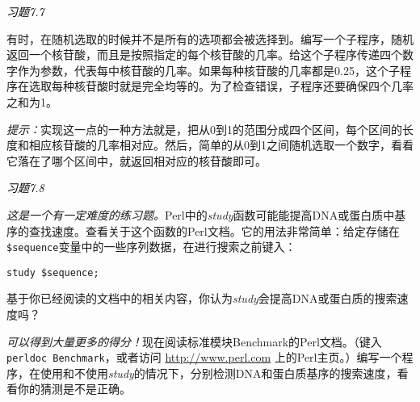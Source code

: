 \textcolor{black}{\textit{习题7.7}}
\begin{adjustwidth}{4em}{}
有时，在随机选取的时候并不是所有的选项都会被选择到。编写一个子程序，随机返回一个核苷酸，而且是按照指定的每个核苷酸的几率。给这个子程序传递四个数字作为参数，代表每中核苷酸的几率。如果每种核苷酸的几率都是0.25，这个子程序在选取每种核苷酸时就是完全均等的。为了检查错误，子程序还要确保四个几率之和为1。

\textit{提示：}实现这一点的一种方法就是，把从0到1的范围分成四个区间，每个区间的长度和相应核苷酸的几率相对应。然后，简单的从0到1之间随机选取一个数字，看看它落在了哪个区间中，就返回相对应的核苷酸即可。
\end{adjustwidth}

\textcolor{black}{\textit{习题7.8}}
\begin{adjustwidth}{4em}{}
\textit{这是一个有一定难度的练习题。}Perl中的\textit{study}函数可能能提高DNA或蛋白质中基序的查找速度。查看关于这个函数的Perl文档。它的用法非常简单：给定存储在 \verb|$sequence|变量中的一些序列数据，在进行搜索之前键入：

\begin{lstlisting}
study $sequence;
\end{lstlisting}

基于你已经阅读的文档中的相关内容，你认为\textit{study}会提高DNA或蛋白质的搜索速度吗？
\end{adjustwidth}

\textit{可以得到大量更多的得分！}现在阅读标准模块Benchmark的Perl文档。（键入 \verb|perldoc Benchmark|，或者访问 \href{http://www.perl.com}{http://www.perl.com} 上的Perl主页。）编写一个程序，在使用和不使用\textit{study}的情况下，分别检测DNA和蛋白质基序的搜索速度，看看你的猜测是不是正确。
